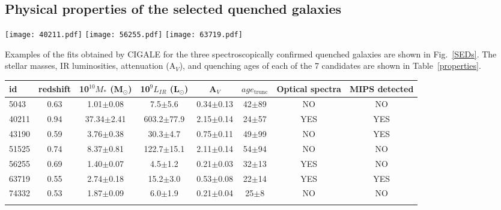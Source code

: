 \documentclass[traditabstract]{aa} %
\begin{document}
\subsection{Physical properties of the selected quenched galaxies}
\begin{figure*}[!h] 
  	\texttt{[image: 40211.pdf]}
  	\texttt{[image: 56255.pdf]}
  	\texttt{[image: 63719.pdf]}
  	\caption{\label{SEDs} Examples of SEDs of galaxies from the final COSMOS quenched sample fitted with CIGALE. The black dots are the data points while the blue solid lines indicate the best fit model. The inset panels show the SFH obtained from the best fit. Key physical parameters are provided for each galaxy. These three galaxies are those confirmed as quenched from their optical spectra.}
\end{figure*}

Examples of the fits obtained by CIGALE for the three spectroscopically confirmed quenched galaxies are shown in Fig.~\ref{SEDs}.
The stellar masses, IR luminosities, attenuation (A$_V$), and quenching ages of each of the 7 candidates are shown in Table~\ref{properties}.

\begin{table*}
	\centering
	\caption{Physical properties obtained with CIGALE for the 7 quenched candidates of the final high-$z$ sample.}
	\begin{tabular}{l c c c c c c c}
	 \hline\hline
	id & redshift & 10$^{10}M_*$ (M$_{\odot}$) &   10$^{9}L_{IR}$ (L$_{\odot}$) & A$_V$ & $age_{\mathrm{trunc}}$ & Optical spectra & MIPS detected\\ 
	\hline
	5043   & 0.63  &1.01$\pm$0.08   & 7.5$\pm$5.6   &  0.34$\pm$0.13 & 42$\pm$89 & NO & NO\\
	40211  & 0.94  &37.34$\pm$2.41  &  603.2$\pm$77.9  &  2.15$\pm$0.14 & 24$\pm$57 & YES& YES\\
	43190  & 0.59  &3.76$\pm$0.38   &  30.3$\pm$4.7  &  0.75$\pm$0.11 & 49$\pm$99 & NO & YES\\
	51525  & 0.74  &8.37$\pm$0.81   &  122.7$\pm$15.1  &  2.11$\pm$0.14 & 54$\pm$94 & NO & NO\\
	56255  & 0.69  &1.40$\pm$0.07   &  4.5$\pm$1.2  &  0.21$\pm$0.03 & 32$\pm$13 & YES& NO\\
	63719  & 0.55  &2.74$\pm$0.18   &  15.2$\pm$3.0  &  0.53$\pm$0.08 & 22$\pm$14 & YES& YES\\
	74332  & 0.53  &1.87$\pm$0.09   &  6.0$\pm$1.9  &  0.21$\pm$0.04 & 25$\pm$8  & NO & NO\\	  
	\hline
	\label{properties}
	\end{tabular}
\end{table*}
\end{document}
